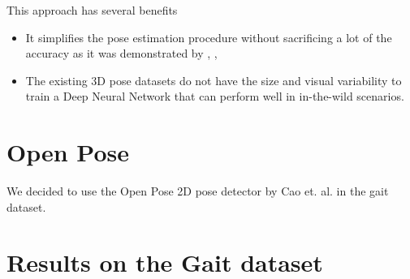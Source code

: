 This approach has several benefits
\begin{itemize}
    \item It simplifies the pose estimation procedure without sacrificing a lot of the accuracy as it was demonstrated by \parencite{martinez2017simple}, \parencite{sun2017compositional}, \parencite{hossain2017exploiting}
    \item The existing 3D pose datasets do not  have the size and visual variability to train a Deep Neural Network that can perform well in in-the-wild scenarios.
\end{itemize}

\section{Open Pose}

We decided to use the Open Pose 2D pose detector by Cao et. al. \parencite{cao2016realtime} in the gait dataset. 

\section{Results on the Gait dataset}

